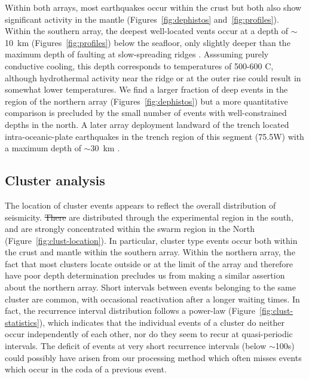 \documentclass[reviewcopy]{elsart}
\providecommand{\DIFadd}[1]{{\protect\color{blue}\uwave{#1}}} %
\providecommand{\DIFdel}[1]{{\protect\color{red}\sout{#1}}}                      %
\providecommand{\DIFaddbegin}{} %
\providecommand{\DIFaddend}{} %
\providecommand{\DIFdelbegin}{} %
\providecommand{\DIFdelend}{} %
\begin{document}
Within both arrays, most earthquakes occur within the crust but both
also show significant activity in the mantle
(Figures~\ref{fig:dephistos} and~\ref{fig:profiles}). Within the southern array, the deepest
well-located vents occur at a depth of
$\sim$10~km (Figures~\ref{fig:profiles}) below the seafloor, only slightly deeper than the
maximum depth of faulting at slow-spreading ridges
\citep[e.g.][]{toomey88,tilmann04}.  Asssuming purely conductive
cooling, this depth corresponds to temperatures of 500-600\dg
C, although hydrothermal activity  near the ridge or at the outer rise
could result in somewhat lower
 temperatures.  We find a
larger fraction of deep events in the region of the northern array
(Figures~\ref{fig:dephistos}) but
a more quantitative comparison is precluded by the small number of
events with well-constrained depths in the north. A later array
deployment landward of the trench located intra-oceanic-plate
earthquakes in the trench region of this segment (75.5\dg W) with a maximum depth of
$\sim$30~km \citep{lange07}. 

\subsection{Cluster analysis}

The location of cluster events appears to reflect the overall
distribution of seismicity.  \DIFdelbegin \DIFdel{There }\DIFdelend \DIFaddbegin \DIFadd{They }\DIFaddend are distributed through the
experimental region in the south, and are strongly concentrated within
the swarm region in the North (Figure~\ref{fig:clust-location}).  In
particular, cluster type events occur both within the crust and mantle
within the southern array.  Within the northern array, the fact that
most clusters locate outside or at the limit of the array and therefore
have poor depth determination precludes us from making a similar
assertion about the northern array.   Short intervals between events
belonging to the same cluster are common, with occasional reactivation
after a longer waiting times.  In fact, the recurrence interval
distribution follows a power-law (Figure~\ref{fig:clust-statistics}\DIFaddbegin \DIFadd{a}\DIFaddend ),
which indicates that the individual events of a cluster do neither occur
independently of each other, nor do they seem to recur at
quasi-periodic intervals.  The deficit of events at very short
recurrence intervals (below $\sim$100s) could possibly have arisen from our
processing method which often  misses events which occur in the
coda of a previous event.
\end{document}
